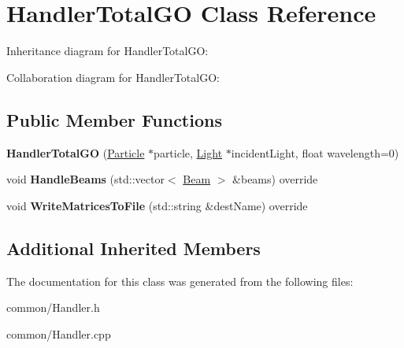 \hypertarget{class_handler_total_g_o}{}\section{Handler\+Total\+GO Class Reference}
\label{class_handler_total_g_o}


Inheritance diagram for Handler\+Total\+GO\+:


Collaboration diagram for Handler\+Total\+GO\+:
\subsection*{Public Member Functions}
\begin{DoxyCompactItemize}
\item 
\mbox{\label{class_handler_total_g_o_a875f12f02fcb152d084b249a353f523e}} 
{\bfseries Handler\+Total\+GO} (\mbox{\hyperlink{class_particle}{Particle}} $\ast$particle, \mbox{\hyperlink{class_light}{Light}} $\ast$incident\+Light, float wavelength=0)
\item 
\mbox{\label{class_handler_total_g_o_ad8500e02d66519a915ad9156114df614}} 
void {\bfseries Handle\+Beams} (std\+::vector$<$ \mbox{\hyperlink{class_beam}{Beam}} $>$ \&beams) override
\item 
\mbox{\label{class_handler_total_g_o_a3548dbfd472665c922958af65ff576ec}} 
void {\bfseries Write\+Matrices\+To\+File} (std\+::string \&dest\+Name) override
\end{DoxyCompactItemize}
\subsection*{Additional Inherited Members}


The documentation for this class was generated from the following files\+:\begin{DoxyCompactItemize}
\item 
common/Handler.\+h\item 
common/Handler.\+cpp\end{DoxyCompactItemize}
